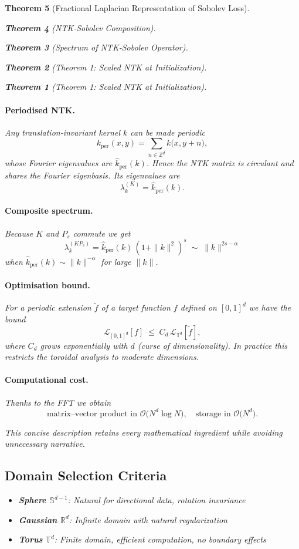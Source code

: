\documentclass{article}
\newtheorem{theorem}{Theorem}[section]
\begin{document}
\begin{theorem}[Fractional Laplacian Representation of Sobolev Loss]
\begin{theorem}[NTK-Sobolev Composition]
\begin{theorem}[Spectrum of NTK-Sobolev Operator]
\begin{theorem}[Theorem 1: Scaled NTK at Initialization]
\begin{theorem}[Theorem 1: Scaled NTK at Initialization]
\paragraph{Periodised NTK.}  Any translation-invariant kernel $k$ can be made periodic
\[
   k_{\text{per}}(x,y)=\sum_{n\in\mathbb Z^d} k\bigl(x, y+n\bigr),
\]
whose Fourier eigenvalues are $\widehat{k}_{\text{per}}(k)$.  Hence the NTK matrix is circulant and shares the Fourier eigenbasis.  Its eigenvalues are
\[
   \lambda_k^{(K)}=\widehat{k}_{\text{per}}(k).
\]

\paragraph{Composite spectrum.}  Because $K$ and $P_s$ commute we get
\[
   \lambda_k^{(KP_s)} = \widehat{k}_{\text{per}}(k)\,(1+\|k\|^2)^{s}
   \;\sim\; \|k\|^{2s-\alpha}
\]
when $\widehat{k}_{\text{per}}(k)\sim\|k\|^{-\alpha}$ for large $\|k\|$.

\paragraph{Optimisation bound.}  For a periodic extension $\tilde f$ of a target function $f$ defined on $[0,1]^d$ we have the bound
\[
   \mathcal L_{[0,1]^d}[f]\;\le\; C_d\,\mathcal L_{\mathbb T^d}[\tilde f],
\]
where $C_d$ grows exponentially with $d$ (curse of dimensionality).  In practice this restricts the toroidal analysis to moderate dimensions.

\paragraph{Computational cost.}  Thanks to the FFT we obtain
\[
   \text{matrix–vector product in }\mathcal O\bigl(N^d\log N\bigr), \quad
   \text{storage in }\mathcal O\bigl(N^d\bigr).
\]

This concise description retains every mathematical ingredient while avoiding unnecessary narrative.

\subsection{Domain Selection Criteria}

\begin{itemize}
\item \textbf{Sphere $\mathbb{S}^{d-1}$}: Natural for directional data, rotation invariance
\item \textbf{Gaussian $\mathbb{R}^d$}: Infinite domain with natural regularization  
\item \textbf{Torus $\mathbb{T}^d$}: Finite domain, efficient computation, no boundary effects
\end{itemize}


\end{theorem}
\end{theorem}
\end{theorem}
\end{theorem}
\end{theorem}
\end{document}
